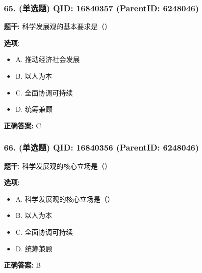 \documentclass[12pt,UTF8]{ctexart}
\begin{document}
\vspace{0.3em}\hrulefill\vspace{0.7em}

\subsubsection*{65. (单选题) \small QID: 16840357 (ParentID: 6248046)}

\textbf{题干:}
科学发展观的基本要求是（）



\textbf{选项:}
\begin{itemize}[leftmargin=*]

  \item A. 推动经济社会发展

  \item B. 以人为本

  \item C. 全面协调可持续

  \item D. 统筹兼顾

\end{itemize}

\textbf{正确答案:}
C

\vspace{0.3em}\hrulefill\vspace{0.7em}

\subsubsection*{66. (单选题) \small QID: 16840356 (ParentID: 6248046)}

\textbf{题干:}
科学发展观的核心立场是（）



\textbf{选项:}
\begin{itemize}[leftmargin=*]

  \item A. 科学发展观的核心立场是（）

  \item B. 以人为本

  \item C. 全面协调可持续

  \item D. 统筹兼顾

\end{itemize}

\textbf{正确答案:}
B

\vspace{0.3em}\hrulefill\vspace{0.7em}
\end{document}
